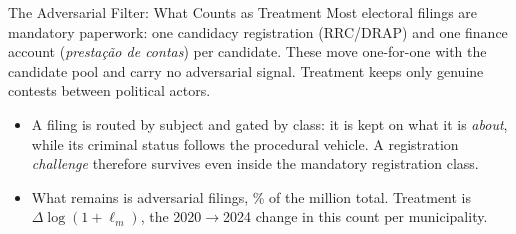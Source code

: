 

\begin{frame}{The Adversarial Filter: What Counts as Treatment}
\hypertarget{src:adversarialfilter}{}
\footnotesize
Most electoral filings are mandatory paperwork: one candidacy registration (RRC/DRAP) and one finance account (\emph{presta\c{c}\~ao de contas}) per candidate. These move one-for-one with the candidate pool and carry no adversarial signal. Treatment keeps only genuine contests between political actors.
\smallskip

\begin{center}
\renewcommand{\arraystretch}{1.15}
\end{center}
\smallskip

\begin{itemize}\itemsep3pt
  \item A filing is routed by subject and gated by class: it is kept on what it is \emph{about}, while its criminal status follows the procedural vehicle. A registration \emph{challenge} therefore survives even inside the mandatory registration class.
  \item What remains is \KeptAdversarialLawsuits{} adversarial filings, \KeptAdversarialPct\% of the \TotalAllLawsuits{} million total. Treatment is $\Delta\log(1+\ell_m)$, the 2020$\to$2024 change in this count per municipality.
\end{itemize}
\end{frame}
